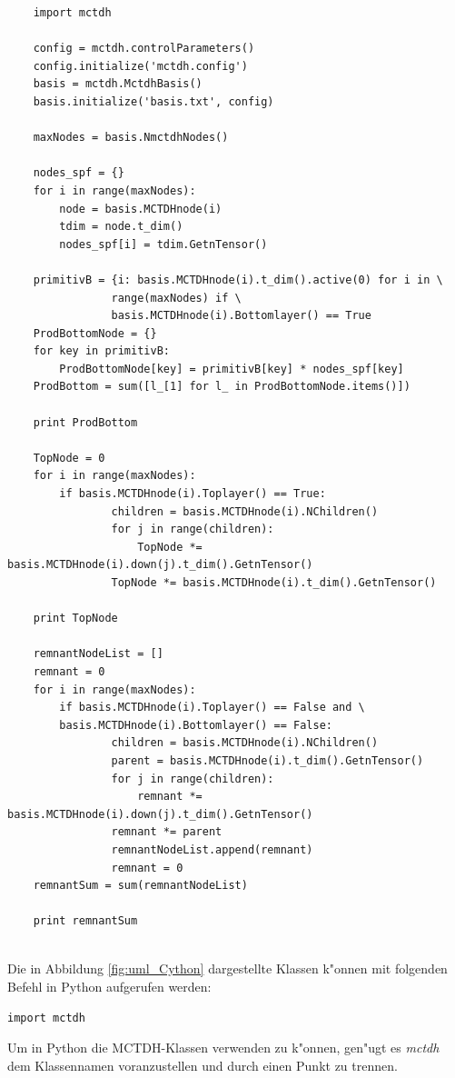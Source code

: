 \begin{verbatim}
    import mctdh

    config = mctdh.controlParameters()
    config.initialize('mctdh.config')
    basis = mctdh.MctdhBasis()
    basis.initialize('basis.txt', config)
    
    maxNodes = basis.NmctdhNodes()
    
    nodes_spf = {}
    for i in range(maxNodes):
        node = basis.MCTDHnode(i)
        tdim = node.t_dim()
        nodes_spf[i] = tdim.GetnTensor() 
    
    primitivB = {i: basis.MCTDHnode(i).t_dim().active(0) for i in \
                range(maxNodes) if \
                basis.MCTDHnode(i).Bottomlayer() == True
    ProdBottomNode = {}
    for key in primitivB:
        ProdBottomNode[key] = primitivB[key] * nodes_spf[key]
    ProdBottom = sum([l_[1] for l_ in ProdBottomNode.items()])

    print ProdBottom

    TopNode = 0
    for i in range(maxNodes):
        if basis.MCTDHnode(i).Toplayer() == True:
                children = basis.MCTDHnode(i).NChildren()
                for j in range(children):
                    TopNode *= basis.MCTDHnode(i).down(j).t_dim().GetnTensor()
                TopNode *= basis.MCTDHnode(i).t_dim().GetnTensor()

    print TopNode
    
    remnantNodeList = []
    remnant = 0
    for i in range(maxNodes):
        if basis.MCTDHnode(i).Toplayer() == False and \
        basis.MCTDHnode(i).Bottomlayer() == False:
                children = basis.MCTDHnode(i).NChildren()
                parent = basis.MCTDHnode(i).t_dim().GetnTensor()
                for j in range(children):
                    remnant *= basis.MCTDHnode(i).down(j).t_dim().GetnTensor() 
                remnant *= parent
                remnantNodeList.append(remnant)
                remnant = 0
    remnantSum = sum(remnantNodeList)
    
    print remnantSum
    
\end{verbatim}


Die in Abbildung \ref{fig:uml_Cython} dargestellte Klassen k"onnen mit folgenden Befehl in Python aufgerufen werden:

\begin{verbatim}
import mctdh
\end{verbatim}

Um in Python die MCTDH-Klassen verwenden zu k"onnen, gen"ugt es \textit{mctdh} dem Klassennamen voranzustellen und durch einen
Punkt zu trennen.

